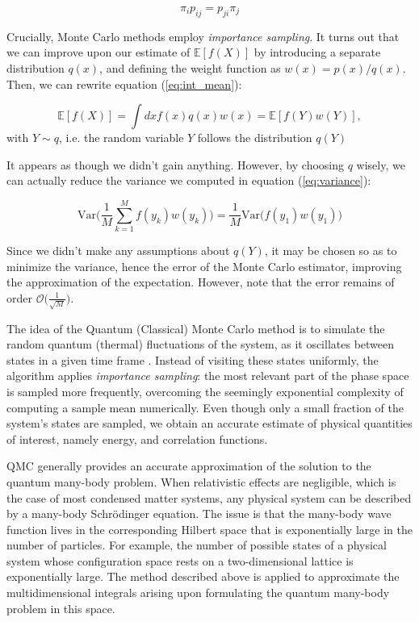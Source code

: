 \documentclass[10pt, twocolumn, twoside]{article}
\begin{document}
\begin{equation}
\pi_i p_{ij} = p_{ji} \pi_j 
\end{equation}

Crucially, Monte Carlo methods employ \emph{importance sampling}. It turns out that we can improve upon our estimate of $\mathbb{E} [f(X)]$ by introducing a separate distribution $q(x)$, and defining the weight function as $w(x) = p(x)/ q(x)$. Then, we can rewrite equation (\ref{eq:int_mean}):

\begin{equation}
\mathbb{E} [f(X)] = \int dx f(x) q(x) w(x) = \mathbb{E} [f(Y) w(Y)],
\end{equation}
with $Y \sim q$, i.e. the random variable $Y$ follows the distribution $q(Y)$

It appears as though we didn't gain anything. However, by choosing $q$ wisely, we can actually reduce the variance we computed in equation (\ref{eq:variance}):

\begin{equation}
\text{Var}\bigg( \frac{1}{M} \sum_{k=1}^M f(y_k) w(y_k) \bigg) = \frac{1}{M} \text{Var}\bigg( f(y_1) w(y_1) \bigg)
\end{equation}

Since we didn't make any assumptions about $q(Y)$, it may be chosen so as to minimize the variance, hence the error of the Monte Carlo estimator, improving the approximation of the expectation. However, note that the error remains of order $\mathcal{O}\big(\frac{1}{\sqrt{M}}\big)$.

The idea of the Quantum (Classical) Monte Carlo method is to simulate the random quantum (thermal) fluctuations of the system, as it oscillates between states in a given time frame \cite{Newman1999}. Instead of visiting these states uniformly, the algorithm applies \emph{importance sampling}: the most relevant part of the phase space is sampled more frequently, overcoming the seemingly exponential complexity of computing a sample mean numerically. Even though only a small fraction of the system's states are sampled, we obtain an accurate estimate of physical quantities of interest, namely energy, and correlation functions.

QMC generally provides an accurate approximation of the solution to the quantum many-body problem. When relativistic effects are negligible, which is the case of most condensed matter systems, any physical system can be described by a many-body Schr\"odinger equation. The issue is that the many-body wave function lives in the corresponding Hilbert space that is  exponentially large in the number of particles. For example, the number of possible states of a physical system whose configuration space rests on a two-dimensional lattice is exponentially large. The method described above is applied to approximate the multidimensional integrals arising upon formulating the quantum many-body problem in this space.
\end{document}
